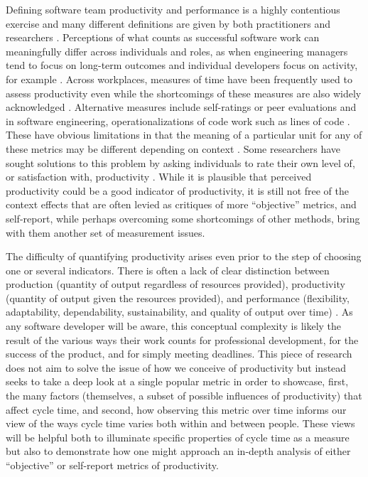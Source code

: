 \documentclass[manuscript,screen,review]{acmart}
\begin{document}
Defining software team productivity and performance is a highly
contentious exercise and many different definitions are given by both
practitioners and researchers
\citep{fraserNoSilverBullet2007, hicksDeveloperThrivingFour2023, hicksDeveloperThrivingFour2024, murphy-hillWhatPredictsSoftware2021, sadowskiSoftwareDevelopmentProductivity2019}.
Perceptions of what counts as successful software work can meaningfully
differ across individuals and roles, as when engineering managers tend
to focus on long-term outcomes and individual developers focus on
activity, for example
\citep{hicksDeveloperThrivingFour2023, storeyHowDevelopersManagers2022b}.
Across workplaces, measures of time have been frequently used to assess
productivity even while the shortcomings of these measures are also
widely acknowledged \citep{griffinMetricsMeasuringProduct1993}.
Alternative measures include self-ratings or peer evaluations
\citep{murphy-hillWhatPredictsSoftware2021, ramirezMeasuringKnowledgeWorker2004}
and in software engineering, operationalizations of code work such as
lines of code
\citep{blackburnImprovingSpeedProductivity1996, maxwellSoftwareDevelopmentProductivity1996}.
These have obvious limitations in that the meaning of a particular unit
for any of these metrics may be different depending on context
\citep{sadowskiSoftwareDevelopmentProductivity2019}. Some researchers
have sought solutions to this problem by asking individuals to rate
their own level of, or satisfaction with, productivity
\citep{hicksDeveloperThrivingFour2023, storeyTheorySoftwareDeveloper2021}.
While it is plausible that perceived productivity could be a good
indicator of productivity, it is still not free of the context effects
that are often levied as critiques of more ``objective'' metrics, and
self-report, while perhaps overcoming some shortcomings of other
methods, bring with them another set of measurement issues.

The difficulty of quantifying productivity arises even prior to the step
of choosing one or several indicators. There is often a lack of clear
distinction between production (quantity of output regardless of
resources provided), productivity (quantity of output given the
resources provided), and performance (flexibility, adaptability,
dependability, sustainability, and quality of output over time)
\citep{hicksDeveloperThrivingFour2023}. As any software developer will
be aware, this conceptual complexity is likely the result of the various
ways their work counts for professional development, for the success of
the product, and for simply meeting deadlines. This piece of research
does not aim to solve the issue of how we conceive of productivity but
instead seeks to take a deep look at a single popular metric in order to
showcase, first, the many factors (themselves, a subset of possible
influences of productivity) that affect cycle time, and second, how
observing this metric over time informs our view of the ways cycle time
varies both within and between people. These views will be helpful both
to illuminate specific properties of cycle time as a measure but also to
demonstrate how one might approach an in-depth analysis of either
``objective'' or self-report metrics of productivity.
\end{document}
